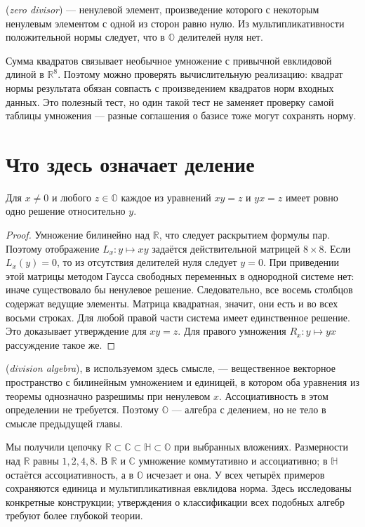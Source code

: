 \begin{definition}
 (\emph{zero divisor}) — ненулевой элемент, произведение которого с некоторым ненулевым элементом с одной из сторон равно нулю. Из мультипликативности положительной нормы следует, что в \(\mathbb O\) делителей нуля нет.
\end{definition}
Сумма квадратов связывает необычное умножение с привычной евклидовой длиной в \(\mathbb R^8\). Поэтому можно проверять вычислительную реализацию: квадрат нормы результата обязан совпасть с произведением квадратов норм входных данных. Это полезный тест, но один такой тест не заменяет проверку самой таблицы умножения — разные соглашения о базисе тоже могут сохранять норму.

\section{Что здесь означает деление}
\begin{theorem}\label{thm:legacy-c25-4}
Для \(x\ne0\) и любого \(z\in\mathbb O\) каждое из уравнений \(xy=z\) и \(yx=z\) имеет ровно одно решение относительно \(y\).
\end{theorem}
\begin{proof}
Умножение билинейно над \(\mathbb R\), что следует раскрытием формулы пар. Поэтому отображение \(L_x:y\mapsto xy\) задаётся действительной матрицей \(8\times8\). Если \(L_x(y)=0\), то из отсутствия делителей нуля следует \(y=0\). При приведении этой матрицы методом Гаусса свободных переменных в однородной системе нет: иначе существовало бы ненулевое решение. Следовательно, все восемь столбцов содержат ведущие элементы. Матрица квадратная, значит, они есть и во всех восьми строках. Для любой правой части система имеет единственное решение. Это доказывает утверждение для \(xy=z\). Для правого умножения \(R_x:y\mapsto yx\) рассуждение такое же.
\end{proof}
\begin{definition}
 (\emph{division algebra}), в используемом здесь смысле, — вещественное векторное пространство с билинейным умножением и единицей, в котором оба уравнения из теоремы однозначно разрешимы при ненулевом \(x\). Ассоциативность в этом определении не требуется. Поэтому \(\mathbb O\) — алгебра с делением, но не тело в смысле предыдущей главы.
\end{definition}
Мы получили цепочку \(\mathbb R\subset\mathbb C\subset\mathbb H\subset\mathbb O\) при выбранных вложениях. Размерности над \(\mathbb R\) равны \(1,2,4,8\). В \(\mathbb R\) и \(\mathbb C\) умножение коммутативно и ассоциативно; в \(\mathbb H\) остаётся ассоциативность, а в \(\mathbb O\) исчезает и она. У всех четырёх примеров сохраняются единица и мультипликативная евклидова норма. Здесь исследованы конкретные конструкции; утверждения о классификации всех подобных алгебр требуют более глубокой теории.

